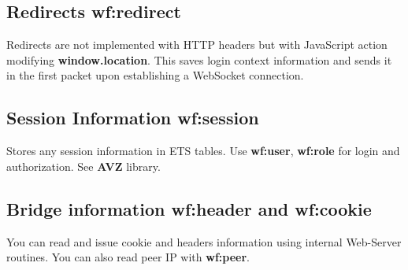 \subsection{Redirects {\bf wf:redirect}}
Redirects are not implemented with HTTP headers but with JavaScript action modifying {\bf window.location}.
This saves login context information and sends it in the first packet upon establishing a WebSocket connection.

\subsection{Session Information {\bf wf:session}}
Stores any session information in ETS tables. Use {\bf wf:user}, {\bf wf:role} for
login and authorization. See {\bf AVZ} library.

\subsection{Bridge information {\bf wf:header} and {\bf wf:cookie}}
You can read and issue cookie and headers information using internal Web-Server routines.
You can also read peer IP with {\bf wf:peer}.

